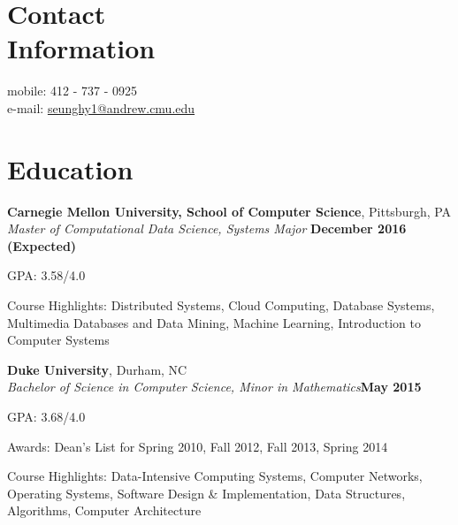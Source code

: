 \documentclass[10pt,margin,line]{resume}
\begin{document}
\begin{resume}

\section{\mysidestyle Contact\\Information}
mobile: 412 - 737 - 0925          		\vspace{0mm}\\\vspace{0mm}%
e-mail: \href{mailto:seunghy1@andrew.cmu.edu}{seunghy1@andrew.cmu.edu}	\vspace{0mm}\\\vspace{-4.5mm}%

\section{\mysidestyle Education}
\textbf{Carnegie Mellon University, School of Computer Science}, Pittsburgh, PA \\\vspace{0mm}%
\textsl{Master of Computational Data Science, Systems Major} \hfill \textbf{December 2016 (Expected)}
\vspace{-3mm}\\\vspace{-1mm}%
\begin{list3}
    \item GPA: 3.58/4.0
    \item Course Highlights: Distributed Systems, Cloud Computing, Database Systems, Multimedia Databases and Data Mining, Machine Learning, Introduction to Computer Systems
\end{list3}

\textbf{Duke University}, Durham, NC \vspace{0mm}\\\vspace{0mm}%
\textsl{Bachelor of Science in Computer Science, Minor in Mathematics}\hfill \textbf{May 2015}
\vspace{-3mm}\\\vspace{-1mm}%
\begin{list3}
    \item GPA: 3.68/4.0
    \item Awards: Dean's List for Spring 2010, Fall 2012, Fall 2013, Spring 2014
    \item Course Highlights: Data-Intensive Computing Systems, Computer Networks, Operating Systems, Software Design \& Implementation, Data Structures, Algorithms, Computer Architecture
\end{list3}


\end{resume}
\end{document}
